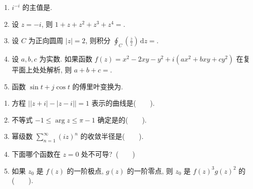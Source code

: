 \documentclass[simple]{hfutexam}
\newcommand{\diff}{\,\mathrm{d}}
\begin{document}
\ZhuanYeBanJi{}
\maketitle

\begin{enumerate}
\item $i^{-i}$ 的主值是\fillblank{}.
\item 设 $z=-i$, 则 $1+z+z^2+z^3+z^4=$\fillblank{}.
\item 设 $C$ 为正向圆周 $|z|=2$, 则积分 $\displaystyle\oint_C\left(\frac{\overline z}{z}\right)\diff z=$\fillblank{}.
\item 设 $a,b,c$ 为实数. 如果函数 $f(z)=x^2-2xy-y^2+i(ax^2+bxy+cy^2)$ 在复平面上处处解析, 则 $a+b+c=$\fillblank{}.
\item 函数 $\sin t+j\cos t$ 的傅里叶变换为\fillblank{}.
\end{enumerate}

\begin{enumerate}
\item 方程 $\bigl||z+i|-|z-i|\bigr|=1$ 表示的曲线是(~~~~).
\item 不等式 $-1\le\arg z\le \pi-1$ 确定是的(~~~~).
\item 幂级数 $\displaystyle\sum_{n=1}^\infty (iz)^n$ 的收敛半径是(~~~~).
\item 下面哪个函数在 $z=0$ 处不可导?~(~~~~)
\item 如果 $z_0$ 是 $f(z)$ 的一阶极点, $g(z)$ 的一阶零点, 则 $z_0$ 是 $f(z)^3g(z)^2$ 的(~~~~).
\end{enumerate}
\end{document}
